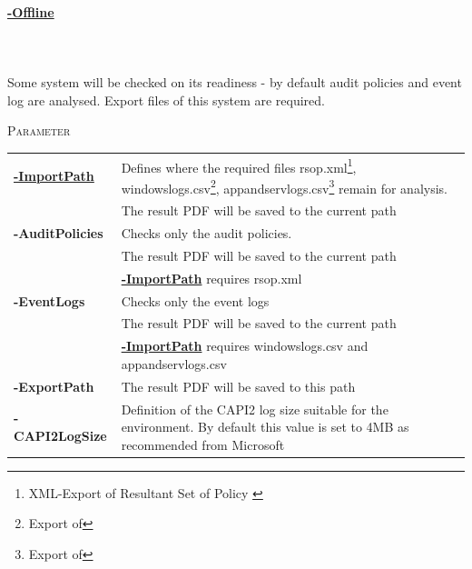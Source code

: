 \begin{tcolorbox}
    \paragraph{\underline{-Offline}} \ \\\\ Some system will be checked on its readiness - by default audit policies and event log are analysed. Export files of this system are required.
    \vspace{0.3cm}
    \begin{center}
        \textsc{Parameter}
    \end{center}
    \vspace{-0.5cm}
    \begin{table}[H]
        \def\arraystretch{2}
        \centering
        \begin{tabular}{ p{4cm}  p{10cm} }  \hline
            \textbf{\underline{-ImportPath}} & Defines where the required files rsop.xml\footnote{XML-Export of Resultant Set of Policy \cite{RSoP}}, windowslogs.csv\footnote{Export of }, appandservlogs.csv\footnote{Export of } remain for analysis. \\ 
            & The result PDF will be saved to the current path \\ \hline
            \textbf{-AuditPolicies} & Checks only the audit policies. \\
            & The result PDF will be saved to the current path \\ 
            & \textbf{\underline{-ImportPath}} requires rsop.xml \\\hline
            \textbf{-EventLogs} & Checks only the event logs \\
            & The result PDF will be saved to the current path \\ 
            & \textbf{\underline{-ImportPath}} requires windowslogs.csv and appandservlogs.csv\\\hline
            \textbf{-ExportPath} & The result PDF will be saved to this path \\ \hline
            \textbf{-CAPI2LogSize} & Definition of the CAPI2 log size suitable for the environment. By default this value is set to 4MB as recommended from Microsoft \cite{CAPI2} \\ \hline
        \end{tabular}
    \end{table}
\end{tcolorbox}

